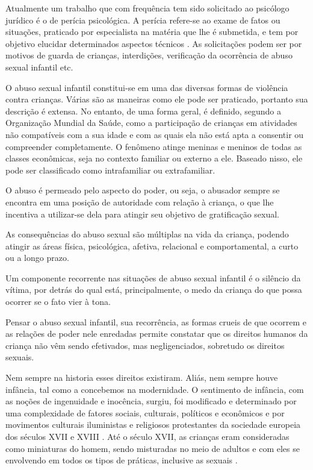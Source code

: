 Atualmente um trabalho que com frequência tem sido solicitado ao psicólogo jurídico é o de perícia psicológica. A perícia refere-se ao exame de fatos ou situações, praticado por especialista na matéria que lhe é submetida, e tem por objetivo elucidar determinados aspectos técnicos . As solicitações podem ser por motivos de guarda de crianças, interdições, verificação da ocorrência de abuso sexual infantil etc.

O abuso sexual infantil constitui-se em uma das diversas formas de violência contra crianças. Várias são as maneiras como ele pode ser praticado, portanto sua descrição é extensa. No entanto, de uma forma geral, é definido, segundo a Organização Mundial da Saúde, como a participação de crianças em atividades não compatíveis com a sua idade e com as quais ela não está apta a consentir ou compreender completamente.  O fenômeno atinge meninas e meninos de todas as classes econômicas, seja no contexto familiar ou externo a ele. Baseado nisso, ele pode ser classificado como intrafamiliar ou extrafamiliar.
	
O abuso é permeado pelo aspecto do poder, ou seja, o abusador sempre se encontra em uma posição de autoridade com relação à criança, o que lhe incentiva a utilizar-se dela para atingir seu objetivo de gratificação sexual. 
	
As consequências do abuso sexual são múltiplas na vida da criança, podendo atingir as áreas física, psicológica, afetiva, relacional e comportamental, a curto ou a longo prazo. 

Um componente recorrente nas situações de abuso sexual infantil é o silêncio da vítima, por detrás do qual está, principalmente, o medo da criança do que possa ocorrer se o fato vier à tona. 

Pensar o abuso sexual infantil, sua recorrência, as formas crueis de que ocorrem e as relações de poder nele enredadas permite constatar que os direitos humanos da criança não vêm sendo efetivados, mas negligenciados, sobretudo os direitos sexuais.  

Nem sempre na historia esses direitos existiram. Aliás, nem sempre houve infância, tal como a concebemos na modernidade. O sentimento de infância, com as noções de ingenuidade e inocência, surgiu, foi modificado e determinado por uma complexidade de fatores sociais, culturais, políticos e econômicos e por movimentos culturais iluministas e religiosos protestantes da sociedade europeia dos séculos XVII e XVIII \cite{aries81}. Até o século XVII, as crianças eram consideradas como miniaturas do homem, sendo misturadas no meio de adultos e com eles se envolvendo em todos os tipos de práticas, inclusive as sexuais \cite{aries11}. 
	
